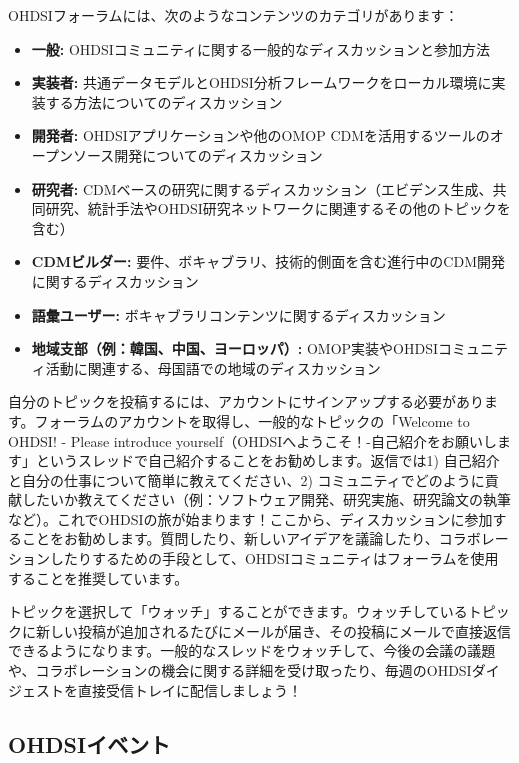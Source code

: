 \documentclass[
  11pt]{book}
\makeatletter
\providecommand{\tightlist}{%
  \setlength{\itemsep}{0pt}\setlength{\parskip}{0pt}}
\newenvironment{kframe}{%
\medskip{}
\setlength{\fboxsep}{.8em}
 \def\at@end@of@kframe{}%
 \ifinner\ifhmode%
  \def\at@end@of@kframe{\end{minipage}}%
  \begin{minipage}{\columnwidth}%
 \fi\fi%
 \def\FrameCommand##1{\hskip\@totalleftmargin \hskip-\fboxsep
 \colorbox{myShadeColor}{##1}\hskip-\fboxsep
     \hskip-\linewidth \hskip-\@totalleftmargin \hskip\columnwidth}%
 \MakeFramed {\advance\hsize-\width
   \@totalleftmargin\z@ \linewidth\hsize
   \@setminipage}}%
 {\par\unskip\endMakeFramed%
 \at@end@of@kframe}
\newenvironment{rmdblock}[1]
  {
  \begin{itemize}
  \renewcommand{\labelitemi}{
    \raisebox{-.7\height}[0pt][0pt]{
      {\setkeys{Gin}{width=3em,keepaspectratio}\texttt{[image: images/\#1]}}
    }
  }
  \setlength{\fboxsep}{1em}
  \begin{kframe}
  \item
  }
  {
  \end{kframe}
  \end{itemize}
  }
\newenvironment{rmdimportant}
  {\begin{rmdblock}{important}}
  {\end{rmdblock}}
\theoremstyle{definition}
\theoremstyle{definition}
\theoremstyle{definition}
\theoremstyle{definition}
\theoremstyle{remark}
\makeatother
\begin{document}
OHDSIフォーラムには、次のようなコンテンツのカテゴリがあります：

\begin{itemize}
\tightlist
\item
  \textbf{一般:} OHDSIコミュニティに関する一般的なディスカッションと参加方法
\item
  \textbf{実装者:} 共通データモデルとOHDSI分析フレームワークをローカル環境に実装する方法についてのディスカッション
\item
  \textbf{開発者:} OHDSIアプリケーションや他のOMOP CDMを活用するツールのオープンソース開発についてのディスカッション
\item
  \textbf{研究者:} CDMベースの研究に関するディスカッション（エビデンス生成、共同研究、統計手法やOHDSI研究ネットワークに関連するその他のトピックを含む）
\item
  \textbf{CDMビルダー:} 要件、ボキャブラリ、技術的側面を含む進行中のCDM開発に関するディスカッション
\item
  \textbf{語彙ユーザー:} ボキャブラリコンテンツに関するディスカッション
\item
  \textbf{地域支部（例：韓国、中国、ヨーロッパ）:} OMOP実装やOHDSIコミュニティ活動に関連する、母国語での地域のディスカッション
\end{itemize}

自分のトピックを投稿するには、アカウントにサインアップする必要があります。フォーラムのアカウントを取得し、一般的なトピックの「Welcome to OHDSI! - Please introduce yourself（OHDSIへようこそ！-自己紹介をお願いします」というスレッドで自己紹介することをお勧めします。返信では1) 自己紹介と自分の仕事について簡単に教えてください、2) コミュニティでどのように貢献したいか教えてください（例：ソフトウェア開発、研究実施、研究論文の執筆など）。これでOHDSIの旅が始まります！ここから、ディスカッションに参加することをお勧めします。質問したり、新しいアイデアを議論したり、コラボレーションしたりするための手段として、OHDSIコミュニティはフォーラムを使用することを推奨しています。 

\begin{rmdimportant}
トピックを選択して「ウォッチ」することができます。ウォッチしているトピックに新しい投稿が追加されるたびにメールが届き、その投稿にメールで直接返信できるようになります。一般的なスレッドをウォッチして、今後の会議の議題や、コラボレーションの機会に関する詳細を受け取ったり、毎週のOHDSIダイジェストを直接受信トレイに配信しましょう！
\end{rmdimportant}

\subsection{OHDSIイベント}\label{ohdsiux30a4ux30d9ux30f3ux30c8}
\end{document}
